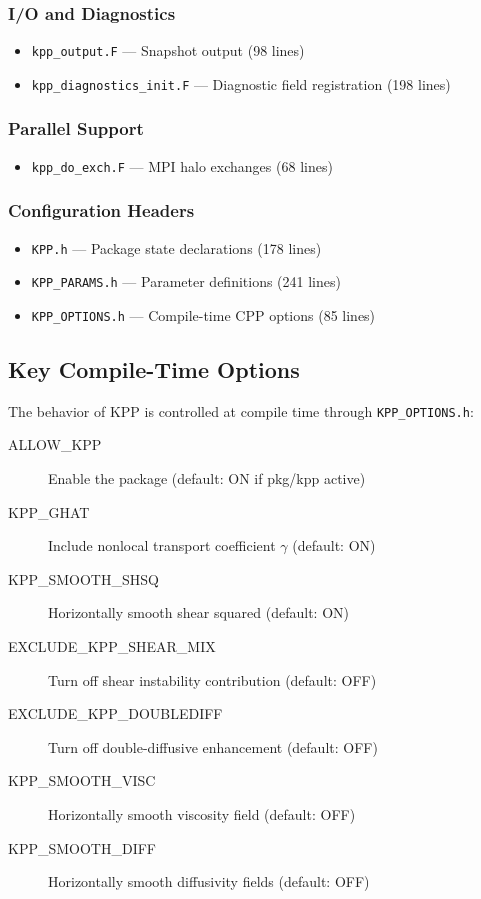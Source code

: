 \documentclass[11pt, a4paper]{article}
\begin{document}
\subsubsection{I/O and Diagnostics}

\begin{itemize}
    \item \texttt{kpp\_output.F} — Snapshot output (98 lines)
    \item \texttt{kpp\_diagnostics\_init.F} — Diagnostic field registration (198 lines)
\end{itemize}

\subsubsection{Parallel Support}

\begin{itemize}
    \item \texttt{kpp\_do\_exch.F} — MPI halo exchanges (68 lines)
\end{itemize}

\subsubsection{Configuration Headers}

\begin{itemize}
    \item \texttt{KPP.h} — Package state declarations (178 lines)
    \item \texttt{KPP\_PARAMS.h} — Parameter definitions (241 lines)
    \item \texttt{KPP\_OPTIONS.h} — Compile-time CPP options (85 lines)
\end{itemize}

\subsection{Key Compile-Time Options}

The behavior of KPP is controlled at compile time through \texttt{KPP\_OPTIONS.h}:

\begin{description}
    \item[ALLOW\_KPP] Enable the package (default: ON if pkg/kpp active)
    \item[KPP\_GHAT] Include nonlocal transport coefficient $\gamma$ (default: ON)
    \item[KPP\_SMOOTH\_SHSQ] Horizontally smooth shear squared (default: ON)
    \item[EXCLUDE\_KPP\_SHEAR\_MIX] Turn off shear instability contribution (default: OFF)
    \item[EXCLUDE\_KPP\_DOUBLEDIFF] Turn off double-diffusive enhancement (default: OFF)
    \item[KPP\_SMOOTH\_VISC] Horizontally smooth viscosity field (default: OFF)
    \item[KPP\_SMOOTH\_DIFF] Horizontally smooth diffusivity fields (default: OFF)
\end{description}
\end{document}
